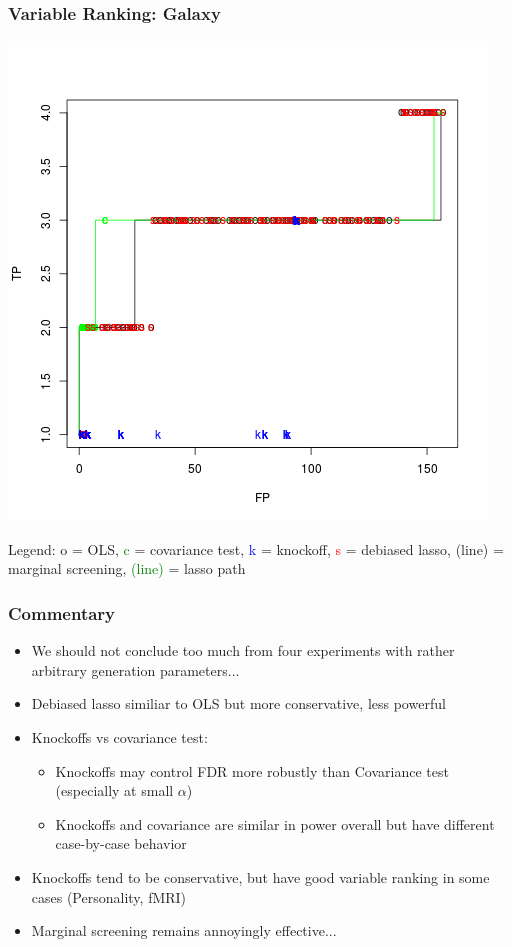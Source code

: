 \documentclass{beamer}
\begin{document}
\begin{frame}
\frametitle{Variable Ranking: Galaxy}
\begin{center}
\includegraphics[scale = 0.35]{gal_tvf.png}
\end{center}

Legend: o = OLS, \textcolor{green}{c} = covariance test,
\textcolor{blue}{k} = knockoff, \textcolor{red}{s} = debiased lasso,
(line) = marginal screening, \textcolor{green}{(line)} = lasso path
\end{frame}


\begin{frame}
\frametitle{Commentary}
\begin{itemize}
\item We should not conclude too much from four experiments with rather arbitrary generation parameters...
\item Debiased lasso similiar to OLS but more conservative, less powerful
\item Knockoffs vs covariance test:
\begin{itemize}
\item Knockoffs may control FDR more robustly than Covariance test (especially at small $\alpha$)
\item Knockoffs and covariance are similar in power overall but have different case-by-case behavior
\end{itemize}
\item Knockoffs tend to be conservative, but have good variable ranking in some cases (Personality, fMRI)
\item Marginal screening remains annoyingly effective...
\end{itemize}
\end{frame}
\end{document}
